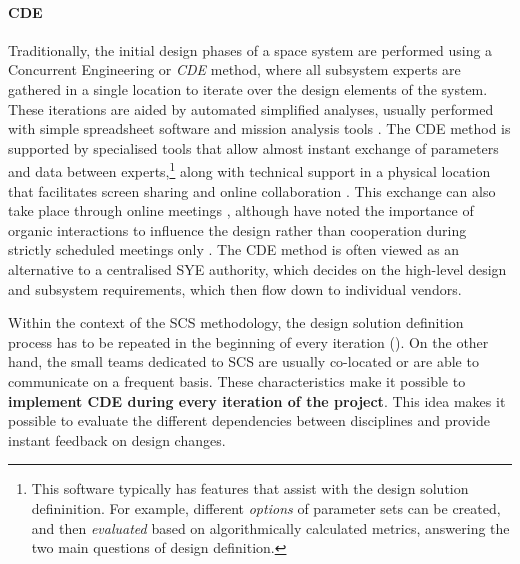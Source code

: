 \documentclass[a4paper,nobib,justified,final]{tufte-book}
\begin{document}
\paragraph[Concurrent Design]{\acf{CDE}}
Traditionally, the initial design phases of a space system are performed using a Concurrent Engineering or \emph{\acf{CDE}} method, where all subsystem experts are gathered in a single location to iterate over the design elements of the system. These iterations are aided by automated simplified analyses, usually performed with simple spreadsheet software and mission analysis tools \autocite{bandecchiConcurrentEngineeringApplied1999}.
The \acs{CDE} method is supported by specialised tools that allow almost instant exchange of parameters and data between experts,\footnote{This software typically has features that assist with the design solution defininition. For example, different \emph{options} of parameter sets can be created, and then \emph{evaluated} based on algorithmically calculated metrics, answering the two main questions of design definition.} along with technical support in a physical location that facilitates screen sharing and online collaboration \autocite{ranaVisionNextGenConcurrent2021}. This exchange can also take place through online meetings \autocite{retselisAdaptationAcubeSATNanosatellite2022}, although \citeauthor{bandecchiConcurrentEngineeringApplied1999} have noted the importance of organic interactions to influence the design rather than cooperation during strictly scheduled meetings only \cite{bandecchiConcurrentEngineeringApplied1999}. The \acs{CDE} method is often viewed as an alternative to a centralised \acs{SYE} authority, which decides on the high-level design and subsystem requirements, which then flow down to individual vendors.

Within the context of the \acs{SCS} methodology, the design solution definition process has to be repeated in the beginning of every iteration (). On the other hand, the small teams dedicated to \acs{SCS} are usually co-located or are able to communicate on a frequent basis. These characteristics make it possible to \textbf{implement \acs{CDE} during every iteration of the project}. This idea makes it possible to evaluate the different dependencies between disciplines and provide instant feedback on design changes.
\end{document}
